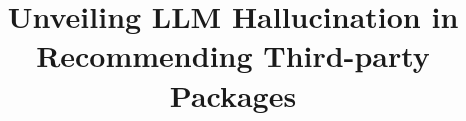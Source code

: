 \documentclass[acmsmall,screen,review,anonymous]{acmart}
\theoremstyle{acmdefinition}
\begin{document}
\begin{sloppypar}

    \title{Unveiling LLM Hallucination in Recommending Third-party Packages}

    


    \begin{abstract}
        
    \end{abstract}

    \maketitle

    
    
    
    
    

    
    
    
    

    
    

\end{sloppypar}
\end{document}
